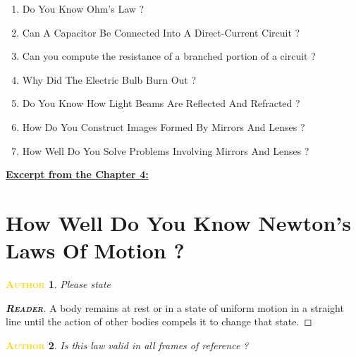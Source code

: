 \begin{enumerate}[nosep]
  \item Do You Know Ohm’s Law ?
  \item Can A Capacitor Be Connected Into A Direct-Current Circuit ?
  \item Can you compute the resistance of a branched portion of a circuit ?
  \item Why Did The Electric Bulb Burn Out ?
  \item Do You Know How Light Beams Are Reflected And Refracted ?
  \item How Do You Construct Images Formed By Mirrors And Lenses ?
  \item How Well Do You Solve Problems Involving Mirrors And Lenses ? 
\end{enumerate}

\hrulefill



\newtheorem{probl}{\textcolor{Gold}{\textbf{\textsc{Author}}}}[chapter]

\renewenvironment{p}    %
  {\renewcommand{\qedsymbol}{$\lozenge$}%
   \pushQED{\qed}\begin{probl}}
  {\popQED\end{probl}}
  
\renewenvironment{s}
  {\renewcommand{\qedsymbol}{\tiny$\blacksquare$}
  \vspace{-\baselineskip}
  \begin{proof}[\emph{\textbf{\scshape \textcolor{BurntOrange}{Reader}}}]\color{zinnwalditebrown}}
  {\end{proof}} 

\underline{\textbf{\textcolor{BurntOrange}{Excerpt from the Chapter} \textcolor{Sepia}{4:}}}


\section{How Well Do You Know Newton's Laws Of Motion ?}



\begin{p}
Please state 
\end{p}


\begin{s}
A body remains at rest or in a state of uniform motion in a straight line until the action of other bodies compels it to change that state. 
\end{s}


\begin{p}
Is this law valid in all frames of reference ?
\end{p}



